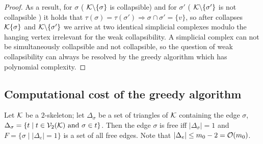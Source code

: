 \begin{proof}
      As a result, for \( \sigma \) ( \( \mathcal{K} \backslash \{ \sigma \} \) is collapsible) and for \( \sigma' \) ( \( \mathcal{K} \backslash \{ \sigma' \} \) is not collapsible ) it holds that \( \tau (\sigma) = \tau (\sigma') \Rightarrow  \sigma \cap \sigma' = \{ v \}  \), so after collapses \( \mathcal{K}  \{ \sigma \} \) and \( \mathcal{K} \backslash \{ \sigma' \} \) we arrive at two identical simplicial complexes modulo the hanging vertex irrelevant for the weak collapsibility. A simplicial complex can not be simultaneously collapsible and not collapsible, so the question of weak collapsibility can always be resolved by the greedy algorithm which has polynomial complexity.
\end{proof}

\begin{comment}
\blav
\begin{remark}
      The proof above is reminiscent of the one for polynomiality of \(d\)-collapsibility, \( d = 1\) or \( d = 2\), \cite{tancer2008dcollapse}, but bares significant differences: firstly, \( 2 \)-collapsibility allows collapses at \(\sigma: \; \dim \sigma \le 1\); secondly, in the scope of \cite{tancer2008dcollapse}, \( \tau(\sigma) = \sigma \) is allowed which affects (complicates) the proof.
\end{remark}
\elav


\begin{remark}
      If \( \mc K \) is weakly collapsible, then the number of triangles can not be higher than the number of edges, \( m_2 \le m_1 \), hence \( \mc K \) is \emph{necessarily sparse} and does not breach the gap up to \( m_2 = \mc O\left( m_1 \ln \left( 4 m_1 \right) \right) \).
\end{remark}
\end{comment}

\subsection{Computational cost of the greedy algorithm}

Let \( \mathcal{K} \) be a \(2\)-skeleton; let \( \Delta_\sigma \) be a set of triangles of \( \mathcal{K} \) containing the edge \( \sigma \), \( \Delta_\sigma = \{ t \mid  t \in \mathcal{V}_{2}(\mathcal{K})  \text{ and } \sigma \in t \} \). Then the edge \( \sigma \) is free iff \( | \Delta_\sigma | = 1 \) and \( F = \{ \sigma \mid | \Delta_e | = 1  \} \) is a set of all free edges. Note that \( | \Delta_e | \le m_0 -2 = \mathcal{O} ( m_0  ) \).

